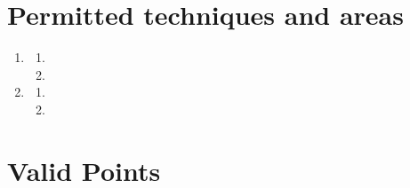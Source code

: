 \documentclass[draft]{report}
\begin{document}
\chapter{Permitted techniques and areas}\label{permitted-techniques-and-areas}

\begin{enumerate}
\item

  \begin{enumerate}
    \item
    
    \item
    
  \end{enumerate}

\item

    \begin{enumerate}
    \item
    
    \item
    
    \end{enumerate}
\end{enumerate}


\chapter{Valid Points}\label{valid-points}
\end{document}
